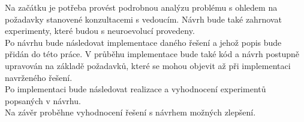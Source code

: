 Na začátku je potřeba provést podrobnou analýzu problému s ohledem na požadavky stanovené konzultacemi s vedoucím. Návrh bude také zahrnovat experimenty, které budou s neuroevolucí provedeny. \\
Po návrhu bude následovat implementace daného řešení a jehož popis bude přidán do této práce. V průběhu implementace bude také kód a návrh postupně upravován na základě požadavků, které se mohou objevit až při implementaci navrženého řešení. \\
Po implementaci bude následovat realizace a vyhodnocení experimentů popsaných v návrhu. \\
Na závěr proběhne vyhodnocení řešení s návrhem možných zlepšení.